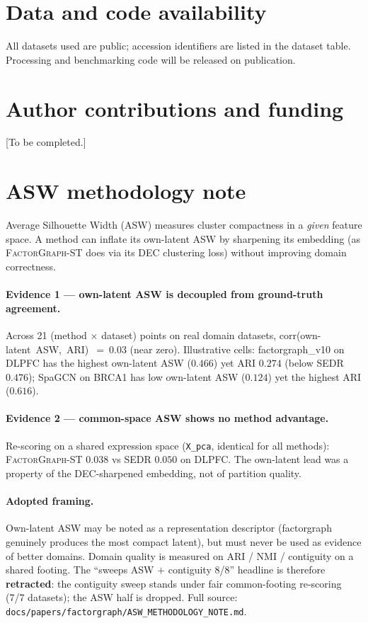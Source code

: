 \documentclass[10pt,letterpaper]{article}
\begin{document}
\section*{Data and code availability}
\label{sec:availability}

All datasets used are public; accession identifiers are listed in the dataset table.
Processing and benchmarking code will be released on publication.

\section*{Author contributions and funding}
\label{sec:contributions}

[To be completed.]

\appendix
\section{ASW methodology note}
\label{app:asw-note}

Average Silhouette Width (ASW) measures cluster compactness in a \emph{given} feature space.
A method can inflate its own-latent ASW by sharpening its embedding (as \textsc{FactorGraph-ST}
does via its DEC clustering loss) without improving domain correctness.

\paragraph{Evidence 1 --- own-latent ASW is decoupled from ground-truth agreement.}
Across 21 (method $\times$ dataset) points on real domain datasets,
corr(own-latent~ASW,~ARI)~$=~0.03$ (near zero). Illustrative cells: factorgraph\_v10 on
DLPFC has the highest own-latent ASW ($0.466$) yet ARI $0.274$ (below SEDR $0.476$);
SpaGCN on BRCA1 has low own-latent ASW ($0.124$) yet the highest ARI ($0.616$).

\paragraph{Evidence 2 --- common-space ASW shows no method advantage.}
Re-scoring on a shared expression space (\texttt{X\_pca}, identical for all methods):
\textsc{FactorGraph-ST} $0.038$ vs SEDR $0.050$ on DLPFC. The own-latent lead was a
property of the DEC-sharpened embedding, not of partition quality.

\paragraph{Adopted framing.} Own-latent ASW may be noted as a representation descriptor
(factorgraph genuinely produces the most compact latent), but must never be used as evidence
of better domains. Domain quality is measured on ARI / NMI / contiguity on a shared footing.
The ``sweeps ASW $+$ contiguity 8/8'' headline is therefore \textbf{retracted}: the
contiguity sweep stands under fair common-footing re-scoring (7/7 datasets); the ASW half
is dropped. Full source: \texttt{docs/papers/factorgraph/ASW\_METHODOLOGY\_NOTE.md}.
\end{document}
